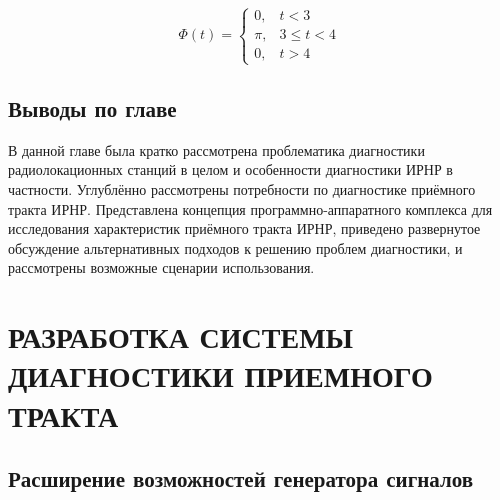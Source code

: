 \documentclass{report}
\begin{document}
$$
\Phi(t) =
\begin{cases}
0, & t < 3 \\
\pi, & 3 \le t < 4 \\
0, & t > 4
\end{cases}
$$

\section*{Выводы по главе}

В данной главе была кратко рассмотрена проблематика диагностики радиолокационных станций в целом и особенности диагностики ИРНР в частности. Углублённо рассмотрены потребности по диагностике приёмного тракта ИРНР. Представлена концепция программно-аппаратного комплекса для исследования характеристик приёмного тракта ИРНР, приведено развернутое обсуждение альтернативных подходов к решению проблем диагностики, и рассмотрены возможные сценарии использования.

\chapter{РАЗРАБОТКА СИСТЕМЫ ДИАГНОСТИКИ ПРИЕМНОГО ТРАКТА}
\setcounter{section}{0}
\setcounter{subsection}{0}
\setcounter{equation}{0}
\section{Расширение возможностей генератора сигналов}
\end{document}
